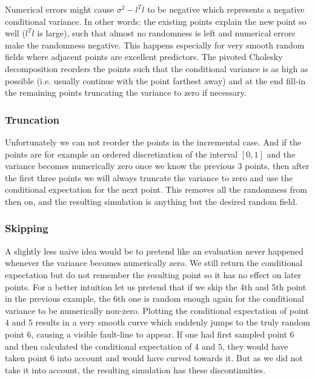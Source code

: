 Numerical errors might cause \(\sigma^2 - l^T l\) to be negative which
represents a negative conditional variance. In other words: the existing points
explain the new point so well (\(l^Tl\) is large), such that almost no
randomness is left and numerical errors make the randomness negative. This
happens especially for very smooth random fields where adjacent points are
excellent predictors. The pivoted Cholesky decomposition reorders the points
such that the conditional variance is as high as possible (i.e. usually continue
with the point farthest away) and at the end fill-in the remaining points
truncating the variance to zero if necessary.

\subsubsection{Truncation}

Unfortunately we can not reorder the points in the incremental case. And if the
points are for example an ordered discretization of the interval \([0,1]\) and
the variance becomes numerically zero once we know the previous \(3\) points,
then after the first three points we will always truncate the variance to zero
and use the conditional expectation for the next point. This removes all the
randomness from then on, and the resulting simulation is anything but the desired
random field.

\subsubsection{Skipping}

A slightly less naïve idea would be to pretend like an evaluation never happened
whenever the variance becomes numerically zero. We still return the conditional
expectation but do not remember the resulting point so it has no effect on later
points. For a better intuition let us pretend that if we skip the 4th and 5th point
in the previous example, the 6th one is random enough again for the conditional
variance to be numerically non-zero. Plotting the conditional expectation of
point \(4\) and \(5\) results in a very smooth curve which suddenly jumps
to the truly random point \(6\), causing a visible fault-line to appear. If one
had first sampled point \(6\) and then calculated the conditional expectation
of \(4\) and \(5\), they would have taken point \(6\) into account and would
have curved towards it. But as we did not take it into account, the resulting
simulation has these discontinuities.

